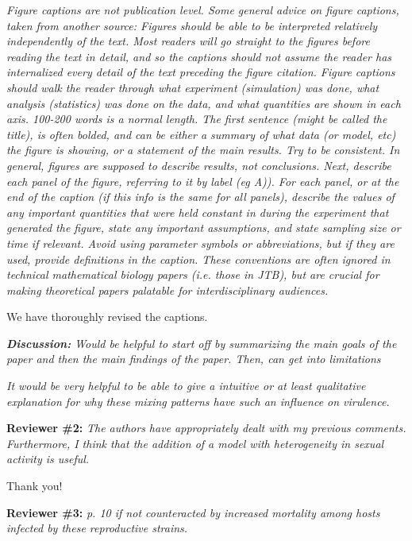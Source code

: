 \documentclass[10pt]{letter}
\newcommand{\revcomment}[1]{\emph{#1}}
\newcommand{\response}[1]{#1}
\begin{document}
\begin{letter}{
}
\revcomment{
Figure captions are not publication level. Some general advice on figure captions, taken from another source: Figures should be able to be interpreted relatively independently of the text. Most readers will go straight to the figures before reading the text in detail, and so the captions should not assume the reader has internalized every detail of the text preceding the figure citation. Figure captions should walk the reader through what experiment (simulation) was done, what analysis (statistics) was done on the data, and what quantities are shown in each axis. 100-200 words is a normal length. The first sentence (might be called the title), is often bolded, and can be either a summary of what data (or model, etc) the figure is showing, or a statement of the main results. Try to be consistent. In general, figures are supposed to describe results, not conclusions. Next, describe each panel of the figure, referring to it by label (eg A)). For each panel, or at the end of the caption (if this info is the same for all panels), describe the values of any important quantities that were held constant in during the experiment that generated the figure, state any important assumptions, and state sampling size or time if relevant. Avoid using parameter symbols or abbreviations, but if they are used, provide definitions in the caption. These conventions are often ignored in technical mathematical biology papers (i.e. those in JTB), but are crucial for making theoretical papers palatable for interdisciplinary audiences.
}

\response{
We have thoroughly revised the captions.
}

\revcomment{
\textbf{Discussion:}
Would be helpful to start off by summarizing the main goals of the paper and then the main findings of the paper. Then, can get into limitations
}
\response{

}

\revcomment{
It would be very helpful to be able to give a intuitive or at least qualitative explanation for why these mixing patterns have such an influence on virulence.
}
\response{

}

\textbf{Reviewer \#2:}
\revcomment{
 The authors have appropriately dealt with my previous comments. Furthermore, I think that the addition of a model with heterogeneity in sexual activity is useful.
}

\response{
Thank you!
}

\textbf{Reviewer \#3:}
\revcomment{
p. 10 if not counteracted by increased mortality among hosts infected by these reproductive strains.
}


\end{letter}
\end{document}
